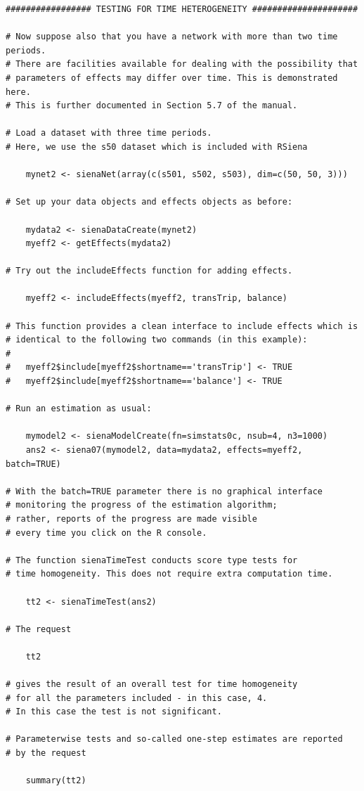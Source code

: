 \documentclass[a4paper,fleqn]{article}
\newcommand{\+}{\, + \,}
\begin{document}
{\begin{verbatim}
################# TESTING FOR TIME HETEROGENEITY #####################

# Now suppose also that you have a network with more than two time periods.
# There are facilities available for dealing with the possibility that
# parameters of effects may differ over time. This is demonstrated here.
# This is further documented in Section 5.7 of the manual.

# Load a dataset with three time periods.
# Here, we use the s50 dataset which is included with RSiena

    mynet2 <- sienaNet(array(c(s501, s502, s503), dim=c(50, 50, 3)))

# Set up your data objects and effects objects as before:

    mydata2 <- sienaDataCreate(mynet2)
    myeff2 <- getEffects(mydata2)

# Try out the includeEffects function for adding effects.

    myeff2 <- includeEffects(myeff2, transTrip, balance)

# This function provides a clean interface to include effects which is
# identical to the following two commands (in this example):
#
#   myeff2$include[myeff2$shortname=='transTrip'] <- TRUE
#   myeff2$include[myeff2$shortname=='balance'] <- TRUE

# Run an estimation as usual:

    mymodel2 <- sienaModelCreate(fn=simstats0c, nsub=4, n3=1000)
    ans2 <- siena07(mymodel2, data=mydata2, effects=myeff2, batch=TRUE)

# With the batch=TRUE parameter there is no graphical interface
# monitoring the progress of the estimation algorithm;
# rather, reports of the progress are made visible
# every time you click on the R console.

# The function sienaTimeTest conducts score type tests for
# time homogeneity. This does not require extra computation time.

    tt2 <- sienaTimeTest(ans2)

# The request

    tt2

# gives the result of an overall test for time homogeneity
# for all the parameters included - in this case, 4.
# In this case the test is not significant.

# Parameterwise tests and so-called one-step estimates are reported
# by the request

    summary(tt2)


\end{verbatim}}
\end{document}
